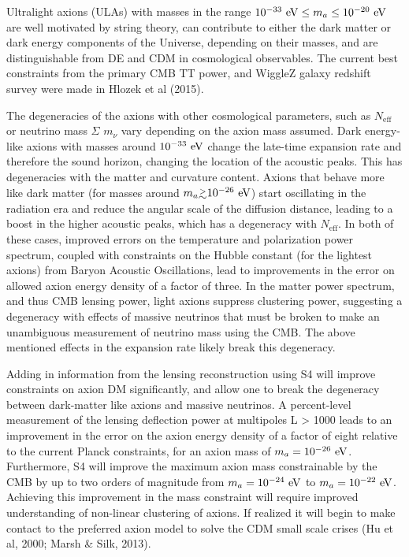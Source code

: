 Ultralight axions (ULAs) with masses in the range $10^{-33}~{\rm eV}\leq m_{a}\leq 10^{-20}~{\rm eV}$ are well motivated by string theory, can contribute to either the dark matter or dark energy components of the Universe, depending on their masses, and are distinguishable from DE and CDM in cosmological observables. The current best constraints from the primary CMB TT power, and WiggleZ galaxy redshift survey were made in Hlozek et al (2015).

The degeneracies of the axions with other cosmological parameters, such as $N_{\mathrm{eff}}$ or neutrino mass $\Sigma$ $m_{\nu}$ vary depending on the axion mass assumed. Dark energy-like axions with masses around $10^{-33}~{\rm eV}$ change the late-time expansion rate and therefore the sound horizon, changing the location of the acoustic peaks. This has degeneracies with the matter and curvature content.
 Axions that behave more like dark matter (for masses around $m_a \gtrsim 10^{-26}~{\rm eV}$) start oscillating in the radiation era and reduce the angular scale of the diffusion distance, leading to a boost in the higher acoustic peaks, which has a degeneracy with $N_\mathrm{eff}$.
 In both of these cases, improved errors on the temperature and polarization power spectrum, coupled with constraints on the Hubble constant (for the lightest axions) from Baryon Acoustic Oscillations, lead to improvements in the error on allowed axion energy density of a factor of three.
In the matter power spectrum, and thus CMB lensing power, light axions suppress clustering power, suggesting a degeneracy with effects of massive neutrinos that must be broken to make an unambiguous measurement of neutrino mass using the CMB. The above mentioned effects in the expansion rate likely break this degeneracy.
 
 Adding in information from the lensing reconstruction using S4 will improve constraints on axion DM significantly, and allow one to break the degeneracy between dark-matter like axions and massive neutrinos. A percent-level measurement of the lensing deflection power at multipoles L > 1000 leads to an improvement in the error on the axion energy density of a factor of eight relative to the current Planck constraints, for an axion mass of $m_a=10^{-26}~{\rm eV}$. Furthermore, S4 will improve the maximum axion mass constrainable by the CMB by up to two orders of magnitude from $m_a=10^{-24}~{\rm eV}$ to $m_a=10^{-22}~{\rm eV}$. Achieving this improvement in the mass constraint will require improved understanding of non-linear clustering of axions. If realized it will begin to make contact to the preferred axion model to solve the CDM small scale crises (Hu et al, 2000; Marsh \& Silk, 2013).


%



